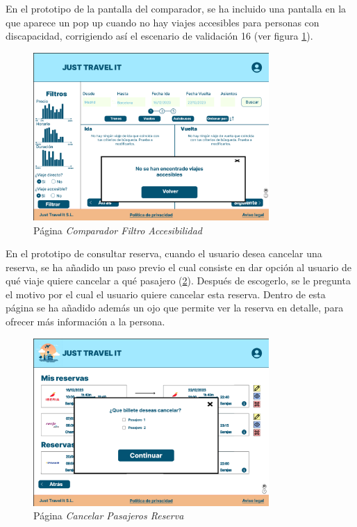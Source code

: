 En el prototipo de la pantalla del comparador, se ha incluido una pantalla en la que aparece un pop up cuando no hay viajes accesibles para personas con discapacidad, corrigiendo así el escenario de validación 16 (ver figura \ref{fig:it2_filtro_accesible}). \\
\begin{figure}[H]
    \centering
    \includegraphics[width = 0.8\textwidth]{Imagenes/hito_5/Iteracion2/No hay viajes accesibles.png}
    \caption{Página \textit{Comparador Filtro Accesibilidad}}
    \label{fig:it2_filtro_accesible}
\end{figure}

En el prototipo de consultar reserva, cuando el usuario desea cancelar una reserva, se ha añadido un paso previo el cual consiste en dar opción al usuario de qué viaje quiere cancelar a 
qué pasajero (\ref{fig:it2_cancelar_pasajeros}). Después de escogerlo, se le pregunta el motivo por el cual el usuario quiere cancelar esta reserva. Dentro de esta página se ha añadido además un ojo
que permite ver la reserva en detalle, para ofrecer más información a la persona. \\
\begin{figure}[H]
    \centering
    \includegraphics[width = 0.8\textwidth]{Imagenes/hito_5/Iteracion2/Cancelar Pasajeros.png}
    \caption{Página \textit{Cancelar Pasajeros Reserva}}
    \label{fig:it2_cancelar_pasajeros}
\end{figure}

